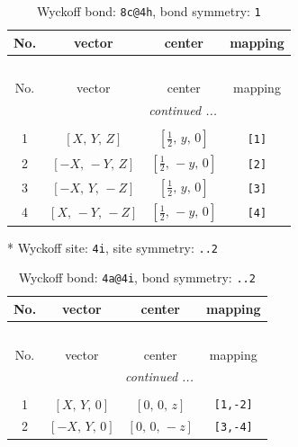 \documentclass[fleqn,8pt]{jsarticle}
\begin{document}
\begin{longtable}{cccc}
\caption{Wyckoff bond: {\tt 8c@4h}, bond symmetry: {\tt 1}}
 \\
 \hline \hline
No. & vector & center & mapping \\ \hline \endfirsthead

\multicolumn{3}{l}{\tablename\ \thetable{}} \\
 \hline \hline
No. & vector & center & mapping \\ \hline \endhead

 \hline \hline
\multicolumn{3}{r}{\footnotesize\it continued ...} \\ \endfoot

 \hline \hline
\multicolumn{3}{r}{} \\ \endlastfoot

1 & $\left[ X,\, Y,\, Z \right]$ & $\left[ \frac{1}{2},\, y,\, 0 \right]$ & {\tt [1]} \\ \hline
2 & $\left[ - X,\, - Y,\, Z \right]$ & $\left[ \frac{1}{2},\, - y,\, 0 \right]$ & {\tt [2]} \\ \hline
3 & $\left[ - X,\, Y,\, - Z \right]$ & $\left[ \frac{1}{2},\, y,\, 0 \right]$ & {\tt [3]} \\ \hline
4 & $\left[ X,\, - Y,\, - Z \right]$ & $\left[ \frac{1}{2},\, - y,\, 0 \right]$ & {\tt [4]} \\
\end{longtable}
* Wyckoff site: {\tt 4i}, site symmetry: {\tt ..2}
\renewcommand{\arraystretch}{1.2}
\begin{longtable}{cccc}
\caption{Wyckoff bond: {\tt 4a@4i}, bond symmetry: {\tt ..2}}
 \\
 \hline \hline
No. & vector & center & mapping \\ \hline \endfirsthead

\multicolumn{3}{l}{\tablename\ \thetable{}} \\
 \hline \hline
No. & vector & center & mapping \\ \hline \endhead

 \hline \hline
\multicolumn{3}{r}{\footnotesize\it continued ...} \\ \endfoot

 \hline \hline
\multicolumn{3}{r}{} \\ \endlastfoot

1 & $\left[ X,\, Y,\, 0 \right]$ & $\left[ 0,\, 0,\, z \right]$ & {\tt [1,-2]} \\ \hline
2 & $\left[ - X,\, Y,\, 0 \right]$ & $\left[ 0,\, 0,\, - z \right]$ & {\tt [3,-4]} \\
\end{longtable}
\end{document}

